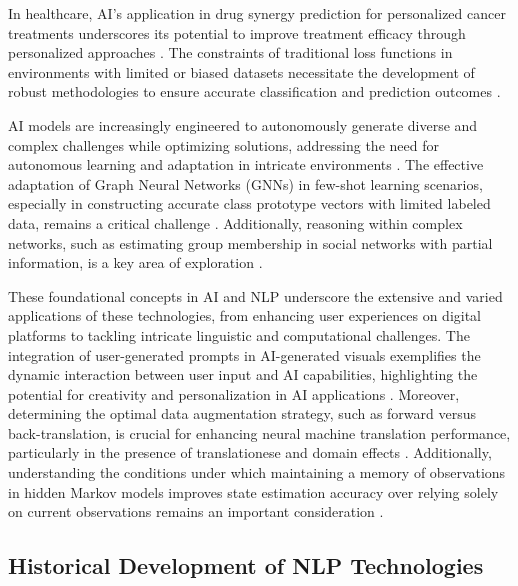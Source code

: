 In healthcare, AI's application in drug synergy prediction for personalized cancer treatments underscores its potential to improve treatment efficacy through personalized approaches \cite{edwards2023synergptincontextlearningpersonalized}. The constraints of traditional loss functions in environments with limited or biased datasets necessitate the development of robust methodologies to ensure accurate classification and prediction outcomes \cite{peiris2021deeplearningnonsmoothobjectives}.



AI models are increasingly engineered to autonomously generate diverse and complex challenges while optimizing solutions, addressing the need for autonomous learning and adaptation in intricate environments \cite{wang2019pairedopenendedtrailblazerpoet}. The effective adaptation of Graph Neural Networks (GNNs) in few-shot learning scenarios, especially in constructing accurate class prototype vectors with limited labeled data, remains a critical challenge \cite{ge2024psppretrainingstructureprompt}. Additionally, reasoning within complex networks, such as estimating group membership in social networks with partial information, is a key area of exploration \cite{shakarian2022reasoningcomplexnetworkslogic}.



These foundational concepts in AI and NLP underscore the extensive and varied applications of these technologies, from enhancing user experiences on digital platforms to tackling intricate linguistic and computational challenges. The integration of user-generated prompts in AI-generated visuals exemplifies the dynamic interaction between user input and AI capabilities, highlighting the potential for creativity and personalization in AI applications \cite{palmini2024patternscreativityuserinput}. Moreover, determining the optimal data augmentation strategy, such as forward versus back-translation, is crucial for enhancing neural machine translation performance, particularly in the presence of translationese and domain effects \cite{bogoychev2020domaintranslationesenoisesynthetic}. Additionally, understanding the conditions under which maintaining a memory of observations in hidden Markov models improves state estimation accuracy over relying solely on current observations remains an important consideration \cite{lathouwers2017memorypaysdiscordhidden}.



\subsection{Historical Development of NLP Technologies} \label{subsec:Historical Development of NLP Technologies}

